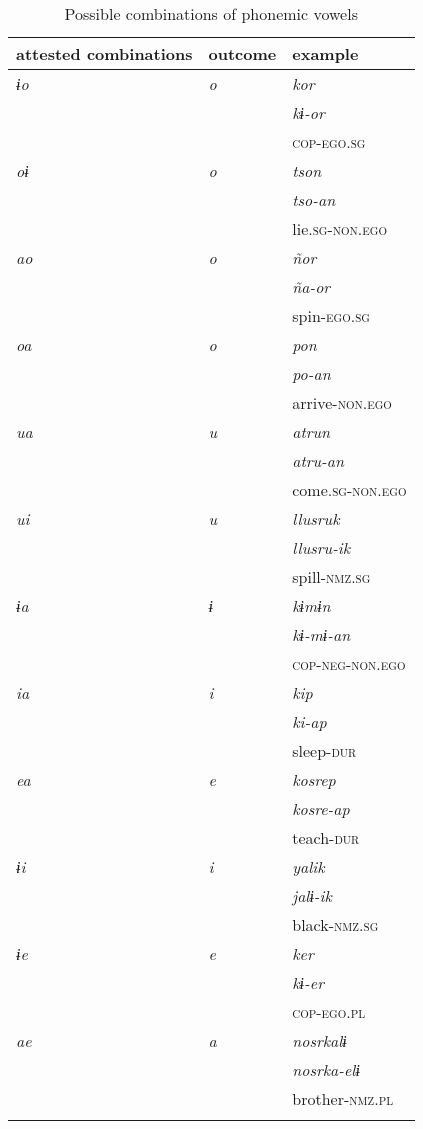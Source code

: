 \documentclass[output=paper]{langsci/langscibook}
\begin{document}
\begin{table}
\begin{tabularx}{\textwidth}{XXX}
\lsptoprule
attested combinations & outcome & example\\
\midrule
\textit{ɨo} & \textit{o} & \textit{kor}\\
& & \textit{kɨ-or}\\
& & \textsc{cop-ego.sg}\\
\hline
\textit{oɨ} & \textit{o} & \textit{tson}\\
& & \textit{tso-an}\\
& & lie.\textsc{sg}-\textsc{non.ego}\\
\hline
\textit{ao} & \textit{o} & \textit{ñor}\\
& & \textit{ña-or}\\
& & spin-\textsc{ego.sg}\\
\hline
\textit{oa} & \textit{o} & \textit{pon}\\
& & \textit{po-an}\\
& & arrive-\textsc{non.ego}\\
\hline
\textit{ua} & \textit{u} & \textit{atrun}\\
& & \textit{atru-an}\\
& & come.\textsc{sg}-\textsc{non.ego}\\
\hline
\textit{ui} & \textit{u} & \textit{llusruk}\\
& & \textit{llusru-ik}\\
& & spill-\textsc{nmz.sg}\\
\hline
\textit{ɨa} & \textit{ɨ} & \textit{kɨmɨn}\\
& & \textit{kɨ-mɨ-an}\\
& & \textsc{cop-neg-non.ego}\\
\hline
\textit{ia} & \textit{i} & \textit{kip}\\
& & \textit{ki-ap}\\
& & sleep-\textsc{dur}\\
\hline
\textit{ea} & \textit{e} & \textit{kosrep}\\
& & \textit{kosre-ap}\\
& & teach-\textsc{dur}\\
\hline
\textit{ɨi} & \textit{i} & \textit{yalik}\\
& & \textit{jalɨ-ik}\\
& & black-\textsc{nmz.sg}\\
\hline
\textit{ɨe} & \textit{e} & \textit{ker}\\
& & \textit{kɨ-er}\\
& & \textsc{cop-ego.pl}\\
\hline
\textit{ae} & \textit{a} & \textit{nosrkalɨ}\\
& & \textit{nosrka-elɨ}\\
& & brother-\textsc{nmz.pl}\\
\lspbottomrule
\end{tabularx}
\caption{Possible combinations of phonemic vowels}
\label{tab:gg4}
\end{table}
\end{document}
